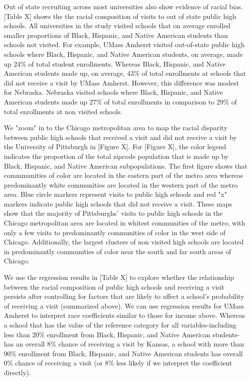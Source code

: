 \documentclass[twoside]{article}
\begin{document}
Out of state recruiting across most universities also show evidence of racial bias. [Table X] shows the the racial composition of visits to out of state public high schools. All universities in the study visited schools that on average enrolled smaller proportions of Black, Hispanic, and Native American students than schools not visited. For example, UMass Amherst visited out-of-state public high schools where Black, Hispanic, and Native American students, on average, made up 24\% of total student enrollments. Whereas Black, Hispanic, and Native American students made up, on average, 43\% of total enrollments at schools that did not receive a visit by UMass Amherst. However, this difference was modest for Nebraska. Nebraska visited schools where Black, Hispanic, and Native American students made up 27\% of total enrollments in comparison to 29\% of total enrollments at non visited schools.

We "zoom" in to the Chicago metropolitan area to map the racial disparity between public high schools that received a visit and did not receive a visit by the University of Pittsburgh in [Figure X]. For [Figure X], the color legend indicates the proportion of the total zipcode population that is made up by Black, Hispanic, and Native American subpopulations. The first figure shows that commmunities of color are located in the eastern part of the metro area whereas predominantly white communities are located in the western part of the metro area. Blue circle markers represent visits to public high schools and red "x" markers indicate public high schools that did not receive a visit. These maps show that the majority of Pittsburghs' visits to public high schools in the Chicago metropolitan area are located in whitest communities of the metro, with only a few visits to predominantly communities of color in the west side of Chicago. Additionally, the largest clusters of non visited high schools are located in predominantly communities of color near the south and far south areas of Chicago.

We use the regression results in [Table X] to explore whether the relationship between the racial composition of public high schools and receiving a visit persists after controlling for factors that are likely to affect a school's probability of receiving a visit (summarized above). We can use regression results for UMass Amherst to interpret race coefficients similar to those for income above. Whereas a school that has the value of the reference category for all variables-including less than 20\% enrollment from Black, Hispanic, and Native American students- has an overall 8\% chance of receiving a visit by Kansas, a school with more than 90\% enrollment from Black, Hispanic, and Native American students has overall 0\% chance of receiving a visit (or 8\% less likely if we interpret the coefficient directly). 
\end{document}
